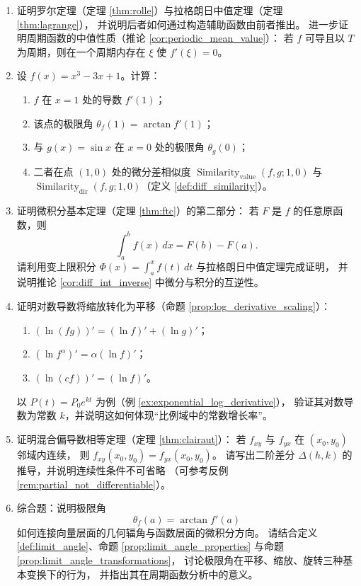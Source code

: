 \begin{enumerate}[leftmargin=3em, label=\textbf{题 \arabic*}]
    \item 证明罗尔定理（定理 \ref{thm:rolle}）与拉格朗日中值定理（定理 \ref{thm:lagrange}），
    并说明后者如何通过构造辅助函数由前者推出。
    进一步证明周期函数的中值性质（推论 \ref{cor:periodic_mean_value}）：
    若 $f$ 可导且以 $T$ 为周期，则在一个周期内存在 $\xi$ 使 $f'(\xi)=0$。

    \item 设 $f(x)=x^3-3x+1$。计算：
    \begin{enumerate}[label=(\roman*)]
        \item $f$ 在 $x=1$ 处的导数 $f'(1)$；
        \item 该点的极限角 $\theta_f(1)=\arctan f'(1)$；
        \item 与 $g(x)=\sin x$ 在 $x=0$ 处的极限角 $\theta_g(0)$；
        \item 二者在点 $(1,0)$ 处的微分差相似度
              $\operatorname{Similarity}_{\text{value}}(f,g;1,0)$ 与\\
              $\operatorname{Similarity}_{\text{dir}}(f,g;1,0)$（定义 \ref{def:diff_similarity}）。
    \end{enumerate}

    \item 证明微积分基本定理（定理 \ref{thm:ftc}）的第二部分：
    若 $F$ 是 $f$ 的任意原函数，则
    \[
    \int_a^b f(x)\,dx=F(b)-F(a).
    \]
    请利用变上限积分 $\Phi(x)=\int_a^x f(t)\,dt$ 与拉格朗日中值定理完成证明，
    并说明推论 \ref{cor:diff_int_inverse} 中微分与积分的互逆性。

    \item 证明对数导数将缩放转化为平移（命题 \ref{prop:log_derivative_scaling}）：
    \begin{enumerate}[label=(\roman*)]
        \item $(\ln(fg))'=(\ln f)'+(\ln g)'$；
        \item $(\ln f^\alpha)'=\alpha(\ln f)'$；
        \item $(\ln(cf))'=(\ln f)'$。
    \end{enumerate}
    以 $P(t)=P_0e^{kt}$ 为例（例 \ref{ex:exponential_log_derivative}），
    验证其对数导数为常数 $k$，并说明这如何体现“比例域中的常数增长率”。

    \item 证明混合偏导数相等定理（定理 \ref{thm:clairaut}）：
    若 $f_{xy}$ 与 $f_{yx}$ 在 $(x_0,y_0)$ 邻域内连续，
    则 $f_{xy}(x_0,y_0)=f_{yx}(x_0,y_0)$。
    请写出二阶差分 $\Delta(h,k)$ 的推导，并说明连续性条件不可省略
    （可参考反例 \ref{rem:partial_not_differentiable}）。

    \item 综合题：说明极限角
    \[
    \theta_f(a)=\arctan f'(a)
    \]
    如何连接向量层面的几何辐角与函数层面的微积分方向。
    请结合定义 \ref{def:limit_angle}、命题 \ref{prop:limit_angle_properties}
    与命题 \ref{prop:limit_angle_transformations}，
    讨论极限角在平移、缩放、旋转三种基本变换下的行为，
    并指出其在周期函数分析中的意义。
\end{enumerate}

